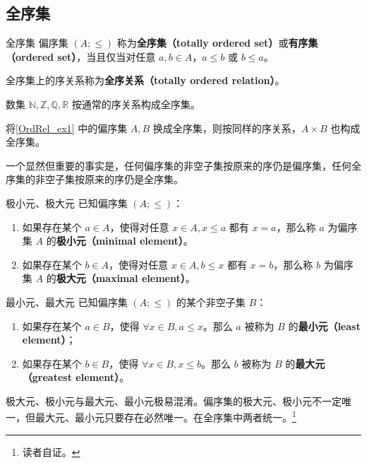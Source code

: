 \subsection{全序集}

\begin{definition}{全序集}
偏序集 $(A;\leq)$ 称为\textbf{全序集（totally ordered set）}或\textbf{有序集（ordered set）}，当且仅当对任意 $a,b \in A$，$a \leq b$ 或 $b \leq a$。
\end{definition}
全序集上的序关系称为\textbf{全序关系（totally ordered relation）}。
\begin{example}{}
数集 $\mathbb{N},\mathbb{Z},\mathbb{Q},\mathbb{R}$ 按通常的序关系构成全序集。
\end{example}
\begin{example}{}
将\autoref{OrdRel_ex1} 中的偏序集 $A,B$ 换成全序集，则按同样的序关系，$A\times B$ 也构成全序集。
\end{example}

一个显然但重要的事实是，任何偏序集的非空子集按原来的序仍是偏序集，任何全序集的非空子集按原来的序仍是全序集。

\begin{definition}{极小元、极大元}
已知偏序集 $(A;\leq)$：
\begin{enumerate}
\item 如果存在某个 $a \in A$，使得对任意 $x \in A, x\leq a$ 都有 $x = a$，那么称 $a$ 为偏序集 $A$ 的\textbf{极小元（minimal element）}。
\item 如果存在某个 $b \in A$，使得对任意 $x \in A, b\leq x$ 都有 $x = b$，那么称 $b$ 为偏序集 $A$ 的\textbf{极大元（maximal element）}。
\end{enumerate}
\end{definition}

\begin{definition}{最小元、最大元}
已知偏序集 $(A;\leq)$ 的某个非空子集 $B$：
\begin{enumerate}
\item 如果存在某个 $a \in B$，使得 $\forall x \in B, a \leq x$。那么 $a$ 被称为 $B$ 的\textbf{最小元（least element）}；
\item 如果存在某个 $b \in B$，使得 $\forall x \in B, x \leq b$。那么 $b$ 被称为 $B$ 的\textbf{最大元（greatest element）}。
\end{enumerate}
\end{definition}

极大元、极小元与最大元、最小元极易混淆。偏序集的极大元、极小元不一定唯一，但最大元、最小元只要存在必然唯一。在全序集中两者统一。\footnote{读者自证。}

